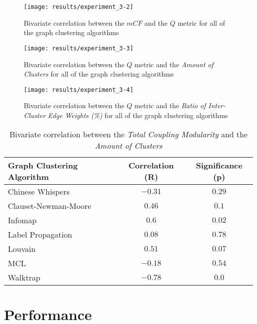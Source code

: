 \documentclass[12pt,a4paper]{report}
\begin{document}
\begin{figure}[htbp]
\centering
\texttt{[image: results/experiment\_3-2]}
\caption{Bivariate correlation between the $mCF$ and the $Q$ metric for all of the graph clustering algorithms}
\label{fig:experiment-3.2}
\end{figure}

\begin{figure}[htbp]
\centering
\texttt{[image: results/experiment\_3-3]}
\caption{Bivariate correlation between the $Q$ metric and the \textit{Amount of Clusters} for all of the graph clustering algorithms}
\label{fig:experiment-3.3}
\end{figure}

\begin{figure}[htbp]
\centering
\texttt{[image: results/experiment\_3-4]}
\caption{Bivariate correlation between the $Q$ metric and the \textit{Ratio of Inter-Cluster Edge Weights (\%)} for all of the graph clustering algorithms}
\label{fig:experiment-3.4}
\end{figure}

\begin{table}[ht!]
\def\arraystretch{1.55}
\begin{tabularx}{\textwidth}{|X|c|c|}
\hline
Graph Clustering Algorithm & Correlation (R) & Significance (p) \\
\hline\hline

Chinese Whispers      & $-0.31$ & $0.29$  \\\hline
Clauset-Newman-Moore  & $0.46$  & $0.1$   \\\hline
Infomap               & $0.6$   & $0.02$  \\\hline
Label Propagation     & $0.08$  & $0.78$  \\\hline
Louvain               & $0.51$  & $0.07$  \\\hline
MCL                   & $-0.18$ & $0.54$  \\\hline
Walktrap              & $-0.78$ & $0.0$   \\\hline

\end{tabularx}
\caption{Bivariate correlation between the \textit{Total Coupling Modularity} and the \textit{Amount of Clusters}}
\label{table:experiment-3.5}
\end{table}



\section{Performance}
\end{document}
